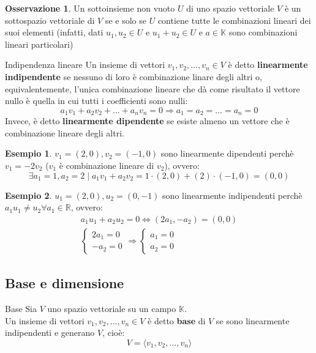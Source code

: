 \documentclass[a4paper]{article}
\theoremstyle{definition}
\newtheorem*{oss}{Osservazione}
\newtheorem*{es}{Esempio}
\begin{document}
\begin{oss}
	Un sottoinsieme non vuoto $U$ di uno spazio vettoriale $V$ è un sottospazio vettoriale di $V$ se e solo se $U$ contiene tutte le combinazioni lineari dei suoi elementi (infatti, dati $u_1, u_2 \in U$ e $u_1 + u_2 \in U$ e $a \in \mathbb{K}$ sono combinazioni lineari particolari)
\end{oss}

\begin{deff}{Indipendenza lineare}{}
	Un insieme di vettori $v_1, v_2, ..., v_n \in V$ è detto \textbf{linearmente indipendente} se nessuno di loro è combinazione linare degli altri o, equivalentemente,
	l'unica combinazione lineare che dà come risultato il vettore nullo è quella in cui tutti i coefficienti sono nulli:
	\[ a_1v_1 + a_2v_2 + ... + a_nv_n = 0 \Rightarrow a_1 = a_2 = ... = a_n = 0 \]
	Invece, è detto \textbf{linearmente dipendente} se esiste almeno un vettore che è combinazione lineare degli altri.
\end{deff}
\begin{es}
	$v_1 = (2, 0), v_2 = (-1, 0)$ sono linearmente dipendenti perchè $v_1 = -2v_2$ ($v_1$ è combinazione lineare di $v_2$), ovvero:
	\[ \exists a_1 = 1, a_2 = 2 \mid a_1v_1 + a_2v_2 = 1 \cdot (2, 0) + (2) \cdot (-1, 0) = (0, 0) \]
\end{es}
\begin{es}
	$u_1 = (2, 0), u_2 = (0, -1)$ sono linearmente indipendenti perchè $a_1u_1 \ne u_2 \forall a_1 \in \mathbb{R}$, ovvero:
	\begin{align*}
		a_1u_1 + a_2u_2 = 0 \Leftrightarrow (2a_1, - a_2) = (0, 0) \\
		\begin{cases}
			2a_1 = 0 \\
			-a_2 = 0
		\end{cases}
		\Rightarrow
		\begin{cases}
			a_1 = 0 \\
			a_2 = 0
		\end{cases}
	\end{align*}
\end{es}

\subsection{Base e dimensione}
\begin{deff}{Base}{}
	Sia $V$ uno spazio vettoriale su un campo $\mathbb{K}$. \\
	Un insieme di vettori $v_1, v_2, ..., v_n \in V$ è detto \textbf{base} di $V$ se sono linearmente indipendenti e generano $V$, cioè:
	\[ V = \langle v_1, v_2, ..., v_n \rangle \]
\end{deff}
\end{document}
